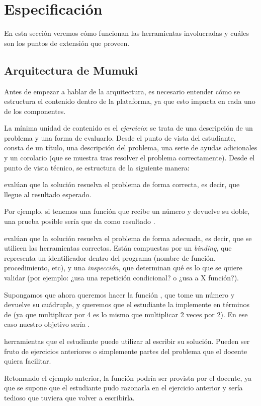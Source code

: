 
\section{Especificación}
En esta sección veremos cómo funcionan las herramientas involucradas y cuáles son los puntos de extensión que proveen.

\subsection{Arquitectura de Mumuki}
Antes de empezar a hablar de la arquitectura, es necesario entender cómo se estructura el contenido dentro de la plataforma, ya que esto impacta en cada uno de los componentes.

La mínima unidad de contenido es el \emph{ejercicio}: se trata de una descripción de un problema y una forma de evaluarlo. Desde el punto de vista del estudiante, consta de un título, una descripción del problema, una serie de ayudas adicionales y un corolario (que se muestra tras resolver el problema correctamente). Desde el punto de vista técnico, se estructura de la siguiente manera:

\begin{itemize}
   evalúan que la solución resuelva el problema de forma correcta, es decir, que llegue al resultado esperado.

  Por ejemplo, si tenemos una función  que recibe un número y devuelve su doble, una prueba posible sería que  da como resultado .

   evalúan que la solución resuelva el problema de forma adecuada, es decir, que se utilicen las herramientas correctas. Están compuestas por un \emph{binding}, que representa un identificador dentro del programa (nombre de función, procedimiento, etc), y una \emph{inspección}, que determinan qué es lo que se quiere validar (por ejemplo: ¿usa una repetición condicional? o ¿usa a X función?).

  Supongamos que ahora queremos hacer la función , que tome un número y devuelve su cuádruple, y queremos que el estudiante la implemente en términos de  (ya que multiplicar por 4 es lo mismo que multiplicar 2 veces por 2). En ese caso nuestro objetivo sería .

   herramientas que el estudiante puede utilizar al escribir su solución. Pueden ser fruto de ejercicios anteriores o simplemente partes del problema que el docente quiera facilitar.

  Retomando el ejemplo anterior, la función  podría ser provista por el docente, ya que se supone que el estudiante pudo razonarla en el ejercicio anterior y sería tedioso que tuviera que volver a escribirla.
\end{itemize}


